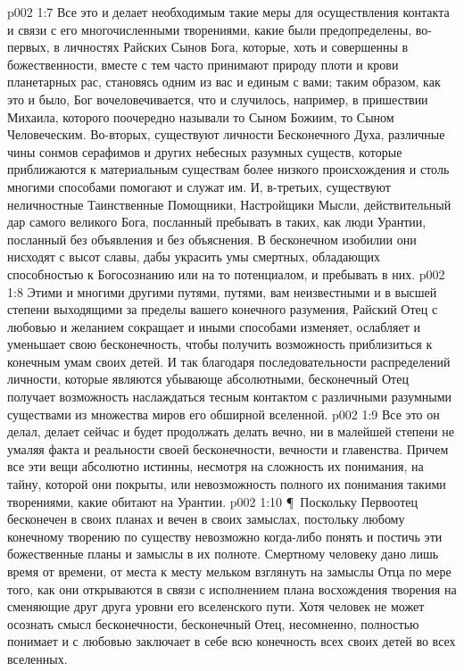 \vs p002 1:7 Все это и делает необходимым такие меры для осуществления контакта и связи с его многочисленными творениями, какие были предопределены, во\hyp{}первых, в личностях Райских Сынов Бога, которые, хоть и совершенны в божественности, вместе с тем часто принимают природу плоти и крови планетарных рас, становясь одним из вас и единым с вами; таким образом, как это и было, Бог вочеловечивается, что и случилось, например, в пришествии Михаила, которого поочередно называли то Сыном Божиим, то Сыном Человеческим. Во\hyp{}вторых, существуют личности Бесконечного Духа, различные чины сонмов серафимов и других небесных разумных существ, которые приближаются к материальным существам более низкого происхождения и столь многими способами помогают и служат им. И, в\hyp{}третьих, существуют неличностные Таинственные Помощники, Настройщики Мысли, действительный дар самого великого Бога, посланный пребывать в таких, как люди Урантии, посланный без объявления и без объяснения. В бесконечном изобилии они нисходят с высот славы, дабы украсить умы смертных, обладающих способностью к Богосознанию или на то потенциалом, и пребывать в них.
\vs p002 1:8 Этими и многими другими путями, путями, вам неизвестными и в высшей степени выходящими за пределы вашего конечного разумения, Райский Отец с любовью и желанием сокращает и иными способами изменяет, ослабляет и уменьшает свою бесконечность, чтобы получить возможность приблизиться к конечным умам своих детей. И так благодаря последовательности распределений личности, которые являются убывающе абсолютными, бесконечный Отец получает возможность наслаждаться тесным контактом с различными разумными существами из множества миров его обширной вселенной.
\vs p002 1:9 Все это он делал, делает сейчас и будет продолжать делать вечно, ни в малейшей степени не умаляя факта и реальности своей бесконечности, вечности и главенства. Причем все эти вещи абсолютно истинны, несмотря на сложность их понимания, на тайну, которой они покрыты, или невозможность полного их понимания такими творениями, какие обитают на Урантии.
\vs p002 1:10 \P\ Поскольку Первоотец бесконечен в своих планах и вечен в своих замыслах, постольку любому конечному творению по существу невозможно когда\hyp{}либо понять и постичь эти божественные планы и замыслы в их полноте. Смертному человеку дано лишь время от времени, от места к месту мельком взглянуть на замыслы Отца по мере того, как они открываются в связи с исполнением плана восхождения творения на сменяющие друг друга уровни его вселенского пути. Хотя человек не может осознать смысл бесконечности, бесконечный Отец, несомненно, полностью понимает и с любовью заключает в себе всю конечность всех своих детей во всех вселенных.

